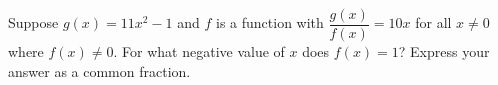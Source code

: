 Suppose $g(x)=11x^2-1$ and $f$ is a function with $\dfrac{g(x)}{f(x)}=10x$ for all $x\ne0$ where $f(x)\ne0$. For what negative value of $x$ does $f(x)=1$? Express your answer as a common fraction.
